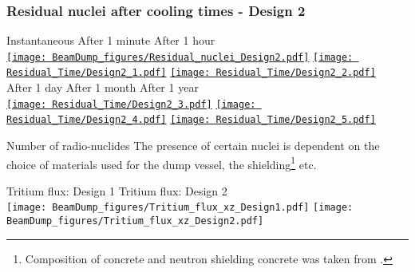 \documentclass[xcolor={dvipsnames}]{beamer}
\begin{document}
\begin{frame}
  \frametitle{Residual nuclei after cooling times - Design 2}
  \hypertarget{residualtimesprev_Design2}{}
  \begin{center}
    \hspace*{1cm} Instantaneous \hfill After 1 minute \hfill After 1 hour \hspace*{1.2cm} \\
  \hyperlink{Residual_nuclei_Design2}{\texttt{[image: BeamDump\_figures/Residual\_nuclei\_Design2.pdf]}}
  \hyperlink{Residual_nuclei_minute_Design2}{\texttt{[image: Residual\_Time/Design2\_1.pdf]}}
  \hyperlink{Residual_nuclei_hour_Design2}{\texttt{[image: Residual\_Time/Design2\_2.pdf]}}\\
    \hspace*{1cm} After 1 day \hfill After 1 month \hfill After 1 year\hspace*{1.4cm} \\
  \hyperlink{Residual_nuclei_day_Design2}{\texttt{[image: Residual\_Time/Design2\_3.pdf]}}
  \hyperlink{Residual_nuclei_month_Design2}{\texttt{[image: Residual\_Time/Design2\_4.pdf]}}
  \hyperlink{Residual_nuclei_year_Design2}{\texttt{[image: Residual\_Time/Design2\_5.pdf]}}
 \end{center}
\end{frame}

\begin{frame}{Number of radio-nuclides}
The presence of certain nuclei is dependent on the choice of materials used for the dump vessel, the shielding\footnote{Composition of concrete and neutron shielding concrete was taken from \cite{Concrete}.} etc.
\begin{center}
\hspace*{1cm} Tritium flux: Design 1 \hfill Tritium flux: Design 2 \hspace*{1cm} \\
  \texttt{[image: BeamDump\_figures/Tritium\_flux\_xz\_Design1.pdf]}
    \texttt{[image: BeamDump\_figures/Tritium\_flux\_xz\_Design2.pdf]}
 \end{center}
\end{frame}
\end{document}
